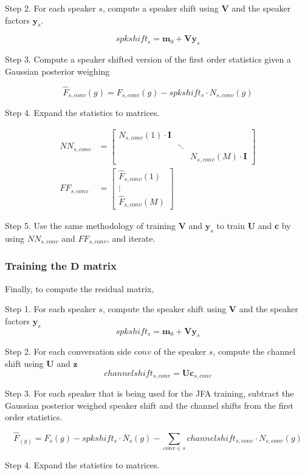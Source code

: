 Step 2. For each speaker $s$, compute a speaker shift using $\bm{V}$ and the speaker factors $\bm{y}_s$.

$$ spkshift_s = \bm{m}_0 + \bm{Vy}_s $$

Step 3. Compute a speaker shifted version of the first order statistics given a Gaussian posterior weighing

$$\hat{F}_{s,conv}(g) = F_{s,conv}(g) - spkshift_s \cdot N_{s,conv}(g) $$

Step 4. Expand the statistics to matrices.

\begin{align*}
    NN_{s,conv} &= \begin{bmatrix} N_{s,conv}(1) \cdot \bm{I} & & \\ & \ddots & \\ & & N_{s,conv}(M) \cdot \bm{I}  \end{bmatrix} \\
    FF_{s,conv} &= \begin{bmatrix} \hat{F}_{s,conv}(1) \\ \vdots \\ \hat{F}_{s,conv}(M) \end{bmatrix}
\end{align*}

Step 5. Use the same methodology of training $\bm{V}$ and $\bm{y}_s$ to train $\bm{U}$ and $\bm{c}$ by using $NN_{s,conv}$ and $FF_{s,conv}$, and iterate.

\subsubsection{Training the $\bm{D}$ matrix}
Finally, to compute the residual matrix,

Step 1. For each speaker $s$, compute the speaker shift using $\bm{V}$ and the speaker factors $\bm{y}_s$
$$ spkshift_s = \bm{m}_0 + \bm{Vy}_s $$

Step 2. For each conversation side $conv$ of the speaker $s$, compute the channel shift using $\bm{U}$ and $\bm{z}$
$$channelshift_{s,conv} = \bm{Uc}_{s,conv} $$

Step 3. For each speaker that is being used for the JFA training, subtract the Gaussian posterior weighed speaker shift and the channel shifts from the first order statistics.

$$\hat{F}_(g) = F_s(g) - spkshift_s \cdot N_s(g) - \sum_{conv \in s} channelshift_{s,conv} \cdot N_{s,conv}(g)$$

Step 4. Expand the statistics to matrices.

